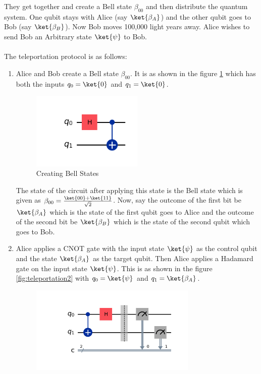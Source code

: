 \documentclass[12pt, oneside]{book}
\theoremstyle{definition}
\theoremstyle{definition}
\theoremstyle{remark}
\begin{document}
They get together and create a Bell state $\beta_{00}$ and then 
distribute the quantum system. One qubit stays with Alice (say $\ket{\beta_A}$) 
and the other qubit goes to Bob (say $\ket{\beta_B}$).
Now Bob moves 100,000 light years away. Alice wishes to send Bob an Arbitrary state $\ket{\psi}$ to Bob.\\
\\
The teleportation protocol is as follows:
\begin{enumerate}
    \item Alice and Bob create a Bell state $\beta_{00}$. It is as shown in the figure \ref{fig:teleportation1} which has both the inputs $q_0=\ket{0}$ and $q_1=\ket{0}$.
    \begin{figure}[H]
        \centering
        \includegraphics[width=0.5\textwidth]{../images/teleportation1.png}
        \caption{Creating Bell States}
        \label{fig:teleportation1}
    \end{figure}
    The state of the circuit after applying this state is the Bell state which is given as $\beta_{00}=\frac{\ket{00}+\ket{11}}{\sqrt{2}}$.
    Now, say the outcome of the first bit be $\ket{\beta_A}$ which is the state of the first qubit goes to Alice and the outcome of the second bit be $\ket{\beta_B}$ which is the state of the second qubit which goes to Bob.
    \item Alice applies a CNOT gate with the input state $\ket{\psi}$ as the control qubit and the state $\ket{\beta_A}$ as the target qubit. Then Alice applies a Hadamard gate on the input state $\ket{\psi}$. This is as shown in the figure \ref{fig:teleportation2} with $q_0=\ket{\psi}$ and $q_1=\ket{\beta_A}$.
    \begin{figure}
        \centering
        \includegraphics[width=0.75\textwidth]{../images/teleportation2.png}

\end{figure}
\end{enumerate}
\end{document}
